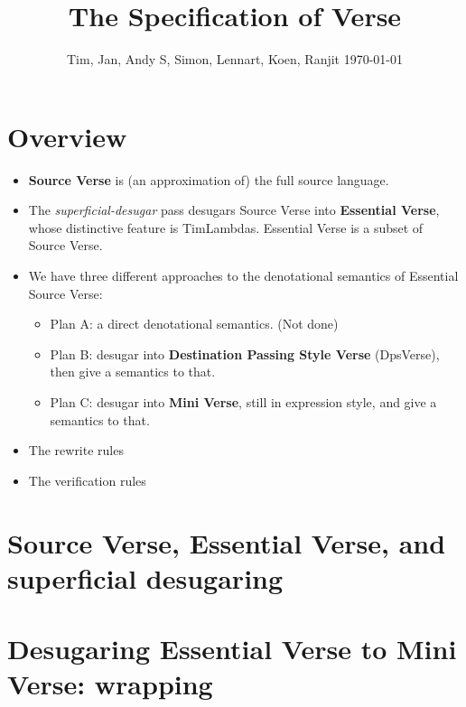 \documentclass[acmsmall,screen,review,9pt]{acmart}\settopmatter{}
\begin{document}
\title{The Specification of Verse}
\author{Tim, Jan, Andy S, Simon, Lennart, Koen, Ranjit \today}
\maketitle

\section{Overview}

\begin{itemize}
\item {\bf Source Verse} is (an approximation of) the full source language.
\item The \emph{superficial-desugar} pass desugars Source Verse into
  {\bf Essential Verse}, whose distinctive feature is TimLambdas.
  Essential Verse is a subset of Source Verse.
\item We have three different approaches to the denotational semantics
  of Essential Source Verse:
  \begin{itemize}
  \item Plan A: a direct denotational semantics. (Not done)
  \item Plan B: desugar into {\bf Destination Passing Style Verse}
    (DpsVerse), then give a semantics to that.
  \item Plan C: desugar into {\bf Mini Verse}, still in expression
    style, and give a semantics to that.
  \end{itemize}
\item The rewrite rules
\item The verification rules
\end{itemize}


\clearpage \newpage
\section{Source Verse, Essential Verse, and superficial desugaring}



\clearpage \newpage
\section{Desugaring Essential Verse to Mini Verse: wrapping}

\end{document}
